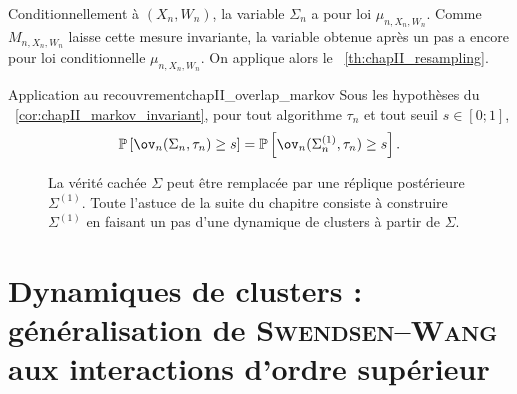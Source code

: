 \begin{Preuve}
Conditionnellement à $(X_n,W_n)$, la variable $\Sigma_n$ a pour loi $\mu_{n,X_n,W_n}$. Comme $M_{n,X_n,W_n}$ laisse cette mesure invariante, la variable obtenue après un pas a encore pour loi conditionnelle $\mu_{n,X_n,W_n}$. On applique alors le \Th~\ref{th:chapII_resampling}.
\end{Preuve}

\begin{Corollaire}{Application au recouvrement}{chapII_overlap_markov}
Sous les hypothèses du \Cor~\ref{cor:chapII_markov_invariant}, pour tout algorithme $\tau_n$ et tout seuil $s\in[0 ; 1]$,
\begin{equation}
    \mathbb P\left[\ov_n(\Sigma_n,\tau_n)\ge s\right]
    =
    \mathbb P\left[\ov_n(\Sigma_n^{(1)},\tau_n)\ge s\right].
    \label{eq:chapII_overlap_markov_proba}
\end{equation}
\end{Corollaire}

\begin{figure}[H]
\centering
{}
\caption{La vérité cachée $\Sigma$ peut être remplacée par une réplique postérieure $\Sigma^{(1)}$. Toute l'astuce de la suite du chapitre consiste à construire $\Sigma^{(1)}$ en faisant un pas d'une dynamique de clusters à partir de $\Sigma$.}
\label{fig:chapII_resampling}
\end{figure}

\section{Dynamiques de clusters : généralisation de \textsc{Swendsen--Wang} aux interactions d'ordre supérieur}
\label{sec:chapII_partie_dynamique}

